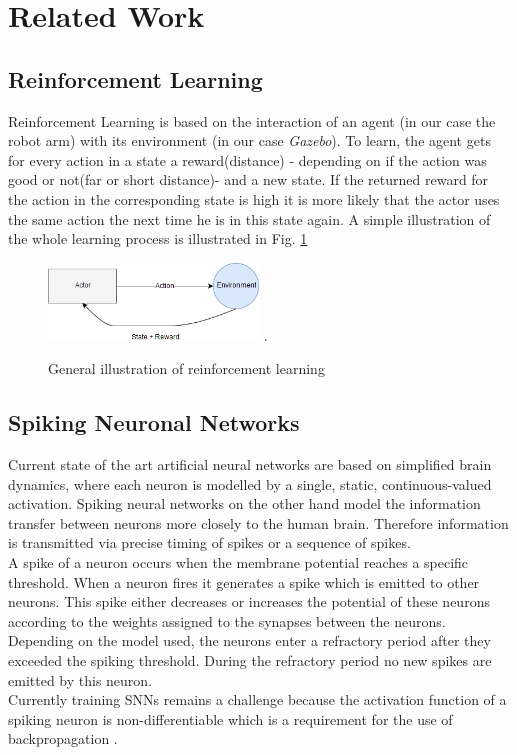 \section{Related Work}
\subsection{Reinforcement Learning}%
Reinforcement Learning is based on the interaction of an agent (in our case the robot arm) with its environment (in our case \textit{Gazebo}). To learn, the agent gets for every action in a state a reward(distance) - depending on if the action was good or not(far or short distance)- and a new state. If the returned reward for the action in the corresponding state is high it is more likely that the actor uses the same action the next time he is in this state again. A simple illustration of the whole learning process is illustrated in Fig. \ref{re_base}
\begin{figure}[H]
	\centering
	\includegraphics[width=2.2in]{img/re_base.png}
	\DeclareGraphicsExtensions.
	\caption{General illustration of reinforcement learning}
	\label{re_base}
\end{figure}

\subsection{Spiking Neuronal Networks}
Current state of the art artificial neural networks are based on simplified brain dynamics, where each neuron is modelled by a single, static, continuous-valued activation. Spiking neural networks on the other hand model the information transfer between neurons more closely to the human brain. Therefore information is transmitted via precise timing of spikes or a sequence of spikes.\\
A spike of a neuron occurs when the membrane potential reaches a specific threshold. When a neuron fires it generates a spike which is emitted to other neurons. This spike either decreases or increases the potential of these neurons according to the weights assigned to the synapses between the neurons. Depending on the model used, the neurons enter a refractory period after they exceeded the spiking threshold. During the refractory period no new spikes are emitted by this neuron.\\
Currently training SNNs remains a challenge because the activation function of a spiking neuron is non-differentiable which is a requirement for the use of backpropagation \cite{DBLP:journals/corr/abs-1804-08150}.


